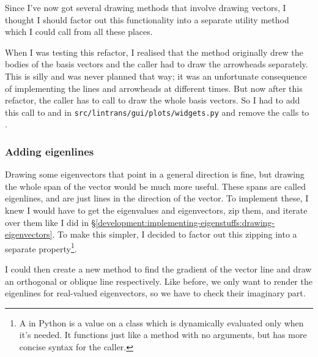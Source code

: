 \documentclass[../development.tex]{subfiles}
\begin{document}
Since I've now got several drawing methods that involve drawing vectors, I thought I should factor out this functionality into a separate utility method which I could call from all these places.


When I was testing this refactor, I realised that the  method originally drew the bodies of the basis vectors and the caller had to draw the arrowheads separately. This is silly and was never planned that way; it was an unfortunate consequence of implementing the lines and arrowheads at different times. But now after this refactor, the caller has to call  to draw the whole basis vectors. So I had to add this call to  and  in \texttt{src/lintrans/gui/plots/widgets.py} and remove the calls to .

\subsubsection{Adding eigenlines\label{development:implementing-eigenvectors:adding-eigenlines}}

Drawing some eigenvectors that point in a general direction is fine, but drawing the whole span of the vector would be much more useful. These spans are called eigenlines, and are just lines in the direction of the vector. To implement these, I knew I would have to get the eigenvalues and eigenvectors, zip them, and iterate over them like I did in \S\ref{development:implementing-eigenstuffs:drawing-eigenvectors}. To make this simpler, I decided to factor out this zipping into a separate  property\footnote{A  in Python is a value on a class which is dynamically evaluated only when it's needed. It functions just like a method with no arguments, but has more concise syntax for the caller.}.


I could then create a new method to find the gradient of the vector line and draw an orthogonal or oblique line respectively. Like before, we only want to render the eigenlines for real-valued eigenvectors, so we have to check their imaginary part.
\end{document}
